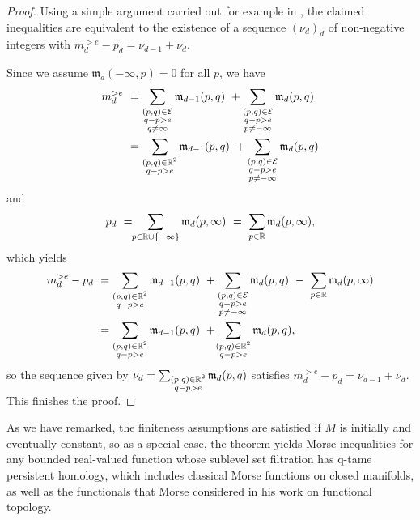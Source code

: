 \begin{proof}
    Using a simple argument carried out for example in \cite[Section 11]{Morse.1940}, the claimed inequalities are equivalent to the existence of a sequence $(\nu_d)_d$ of non-negative integers with $m^{>e}_{d} - p_{d} = \nu_{d-1} + \nu_{d}$. 
    
    Since we assume $\mathfrak{m}_d(-\infty, p) = 0$ for all $p$, we have
    \begin{align*}
    m^{>e}_{d}
    \ &=
    \sum_{\substack{(p,q) \in \mathcal{E} \\ q - p > e \\ q \neq \infty}} \mathfrak{m}_{d-1}(p,q)
    \ +
    \sum_{\substack{(p,q) \in \mathcal{E} \\ q - p > e \\ p \neq -\infty}}\mathfrak{m}_d(p,q)
    \\
    &=
    \sum_{\substack{(p,q) \in \mathbb{R}^2 \\ q - p > e }} \mathfrak{m}_{d-1}(p,q)
    \ +
    \sum_{\substack{(p,q) \in \mathcal{E} \\ q - p > e \\ p \neq -\infty}}\mathfrak{m}_d(p,q)
    \end{align*}
    and
    \[
    p_{d}
    \ = \!\!
    \sum_{p \in \mathbb{R} \cup \{-\infty\}} \mathfrak{m}_d(p,\infty)
    \ = \
    \sum_{p \in \mathbb{R}} \mathfrak{m}_d(p,\infty),
    \]
    which yields
    \begin{align*}
    m^{>e}_{d} - p_{d} \
    &= 
    \sum_{\substack{(p,q) \in \mathbb{R}^2 \\ q - p > e }} \mathfrak{m}_{d-1}(p,q)
    \ +
    \sum_{\substack{(p,q) \in \mathcal{E} \\ q - p > e \\ p \neq -\infty}}\mathfrak{m}_d(p,q)
    \ - \
    \sum_{p \in \mathbb{R}} \mathfrak{m}_d(p,\infty)
    \\
    &=
    \sum_{\substack{(p,q) \in \mathbb{R}^2 \\ q - p > e }} \mathfrak{m}_{d-1}(p,q)
    \ + \!
    \sum_{\substack{(p,q) \in \mathbb{R}^2 \\ q - p > e }}\mathfrak{m}_d(p,q),
    \end{align*}
    so the sequence given by $\nu_d = \sum_{\substack{(p,q) \in \mathbb{R}^2 \\ q - p > e }}\mathfrak{m}_d(p,q)$ satisfies $m^{>e}_{d} - p_{d} = \nu_{d-1} + \nu_{d}$. This finishes the proof.
\end{proof}
As we have remarked, the finiteness assumptions are satisfied if $M$ is initially and eventually constant, so as a special case, the theorem yields Morse inequalities for any bounded real-valued function whose sublevel set filtration has q-tame persistent homology, which includes classical Morse functions on closed manifolds, as well as the functionals that Morse considered in his work on functional topology.

